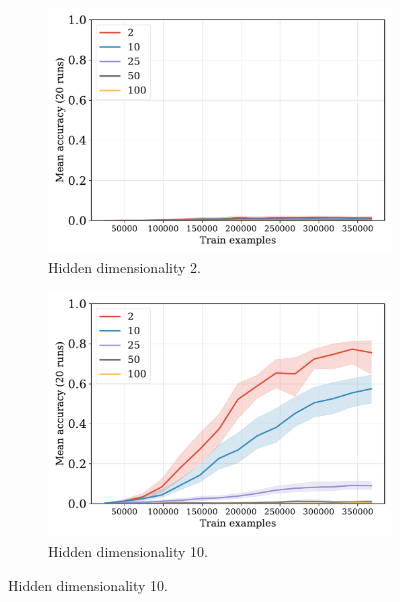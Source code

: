 \documentclass[12pt]{article}
\begin{document}
\begin{figure}[H]
  \centering

  \begin{subfigure}{0.45\linewidth}
    \includegraphics[width=1\textwidth]{fig/fuzzy-lm-vocab50-train_size-embed_dim-hidden_dim=2.pdf}
    \caption{Hidden dimensionality 2.}
  \end{subfigure}
  \hfill
  \begin{subfigure}{0.45\linewidth}
    \includegraphics[width=1\textwidth]{fig/fuzzy-lm-vocab50-train_size-embed_dim-hidden_dim=10.pdf}
    \caption{Hidden dimensionality 10.}
  \end{subfigure}


\end{figure}
\end{document}
